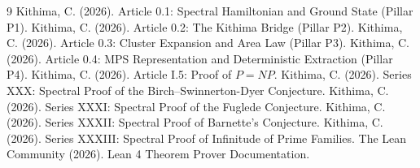 \documentclass[11pt,a4paper]{article}
\begin{document}

\begin{thebibliography}{9}
  Kithima, C. (2026). Article 0.1: Spectral Hamiltonian and Ground State (Pillar P1).
  Kithima, C. (2026). Article 0.2: The Kithima Bridge (Pillar P2).
  Kithima, C. (2026). Article 0.3: Cluster Expansion and Area Law (Pillar P3).
  Kithima, C. (2026). Article 0.4: MPS Representation and Deterministic Extraction (Pillar P4).
  Kithima, C. (2026). Article I.5: Proof of \(P = NP\).
  Kithima, C. (2026). Series XXX: Spectral Proof of the Birch–Swinnerton-Dyer Conjecture.
  Kithima, C. (2026). Series XXXI: Spectral Proof of the Fuglede Conjecture.
  Kithima, C. (2026). Series XXXII: Spectral Proof of Barnette's Conjecture.
  Kithima, C. (2026). Series XXXIII: Spectral Proof of Infinitude of Prime Families.
  The Lean Community (2026). Lean 4 Theorem Prover Documentation.
\end{thebibliography}
\end{document}
